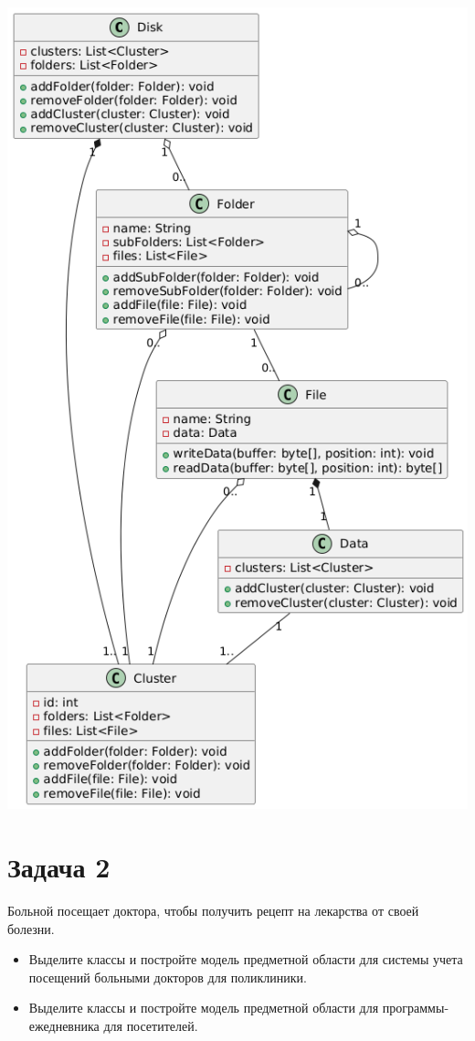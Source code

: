 \documentclass{article}
\begin{document}
\includegraphics[width=\textwidth]{1.png}

\section{Задача 2}
Больной посещает доктора, чтобы получить рецепт на лекарства от своей болезни.

\begin{itemize}
    \item Выделите классы и постройте модель предметной области для системы учета посещений больными докторов для поликлиники.
    \item Выделите классы и постройте модель предметной области для программы-ежедневника для посетителей.
\end{itemize}
\end{document}
